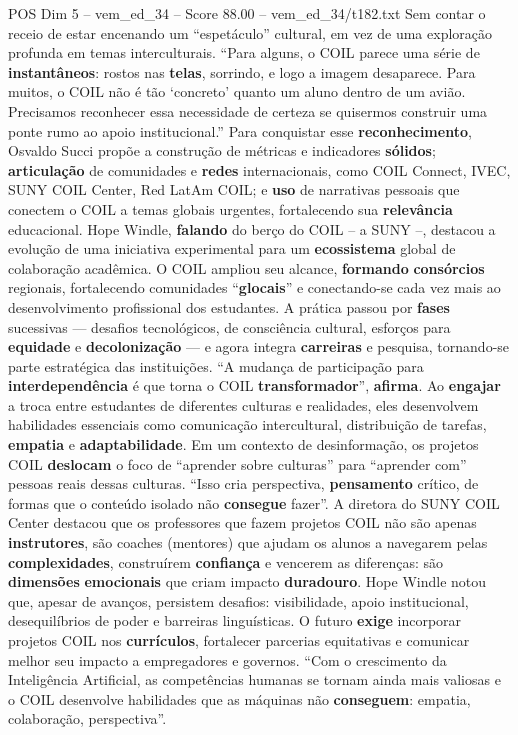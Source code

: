 \begin{textsample}{POS Dim 5 – vem\_ed\_34 – Score 88.00 – vem\_ed\_34/t182.txt}
Sem contar o receio de estar encenando um “espetáculo” cultural, em vez de uma exploração profunda em temas interculturais. “Para alguns, o COIL parece uma série de \textbf{instantâneos}: rostos nas \textbf{telas}, sorrindo, e logo a imagem desaparece.
Para muitos, o COIL não é tão ‘concreto’ quanto um aluno dentro de um avião.
Precisamos reconhecer essa necessidade de certeza se quisermos construir uma ponte rumo ao apoio institucional.” Para conquistar esse \textbf{reconhecimento}, Osvaldo Succi propõe a construção de métricas e indicadores \textbf{sólidos}; \textbf{articulação} de comunidades e \textbf{redes} internacionais, como COIL Connect, IVEC, SUNY COIL Center, Red LatAm COIL; e \textbf{uso} de narrativas pessoais que conectem o COIL a temas globais urgentes, fortalecendo sua \textbf{relevância} educacional.
Hope Windle, \textbf{falando} do berço do COIL – a SUNY –, destacou a evolução de uma iniciativa experimental para um \textbf{ecossistema} global de colaboração acadêmica.
O COIL ampliou seu alcance, \textbf{formando} \textbf{consórcios} regionais, fortalecendo comunidades “\textbf{glocais}” e conectando-se cada vez mais ao desenvolvimento profissional dos estudantes.
A prática passou por \textbf{fases} sucessivas — desafios tecnológicos, de consciência cultural, esforços para \textbf{equidade} e \textbf{decolonização} — e agora integra \textbf{carreiras} e pesquisa, tornando-se parte estratégica das instituições. “A mudança de participação para \textbf{interdependência} é que torna o COIL \textbf{transformador}”, \textbf{afirma}.
Ao \textbf{engajar} a troca entre estudantes de diferentes culturas e realidades, eles desenvolvem habilidades essenciais como comunicação intercultural, distribuição de tarefas, \textbf{empatia} e \textbf{adaptabilidade}.
Em um contexto de desinformação, os projetos COIL \textbf{deslocam} o foco de “aprender sobre culturas” para “aprender com” pessoas reais dessas culturas. “Isso cria perspectiva, \textbf{pensamento} crítico, de formas que o conteúdo isolado não \textbf{consegue} fazer”.
A diretora do SUNY COIL Center destacou que os professores que fazem projetos COIL não são apenas \textbf{instrutores}, são coaches (mentores) que ajudam os alunos a navegarem pelas \textbf{complexidades}, construírem \textbf{confiança} e vencerem as diferenças: são \textbf{dimensões} \textbf{emocionais} que criam impacto \textbf{duradouro}.
Hope Windle notou que, apesar de avanços, persistem desafios: visibilidade, apoio institucional, desequilíbrios de poder e barreiras linguísticas.
O futuro \textbf{exige} incorporar projetos COIL nos \textbf{currículos}, fortalecer parcerias equitativas e comunicar melhor seu impacto a empregadores e governos. “Com o crescimento da Inteligência Artificial, as competências humanas se tornam ainda mais valiosas e o COIL desenvolve habilidades que as máquinas não \textbf{conseguem}: empatia, colaboração, perspectiva”.

\end{textsample}
